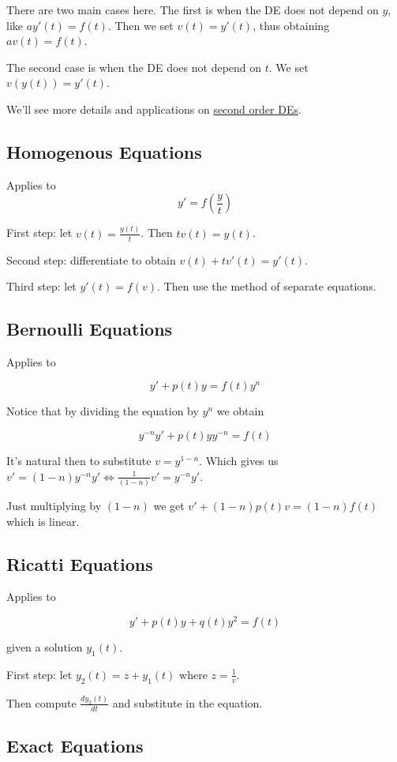 \documentclass[12pt,a4paper]{article}
\begin{document}
There are two main cases here. The first is when the DE does not depend on $y$, like $ay'(t)=f(t)$. Then we set $v(t) = y'(t)$, thus obtaining $av(t)=f(t)$. 

The second case is when the DE does not depend on $t$.  We set $v(y(t)) = y'(t)$. 

We'll see more details and applications on \hyperref[reductio]{second order DEs}.

\subsection{Homogenous Equations}

Applies to \[ y' = f\left(\frac{y}{t}\right) \]

First step: let $v(t) = \frac{y(t)}{t}$. Then $tv(t)=y(t)$.

Second step: differentiate to obtain $v(t)+tv'(t)=y'(t)$.

Third step: let $y'(t)=f(v)$. Then use the method of separate equations.

\subsection{Bernoulli Equations}

Applies to 

\[
y'+p(t)y=f(t)y^n
\]

Notice that by dividing the equation by $y^n$ we obtain

\[
y^{-n}y'+p(t)yy^{-n}=f(t)
\]

It's natural then to substitute $v=y^{1-n}$. Which gives us $v' = (1-n)y^{-n}y' \iff \frac{1}{(1-n)}v'=y^{-n}y'$.

Just multiplying by $(1-n)$ we get $v'+(1-n)p(t)v=(1-n)f(t)$ which is linear.

\subsection{Ricatti Equations}

Applies to

\[
y'+p(t)y+q(t)y^2=f(t)
\]

given a solution $y_1(t)$.

First step: let $y_2(t)=z+y_1(t)$ where $z=\frac{1}{v}$.

Then compute $\frac{dy_2(t)}{dt}$ and substitute in the equation.

\subsection{Exact Equations}
\end{document}
